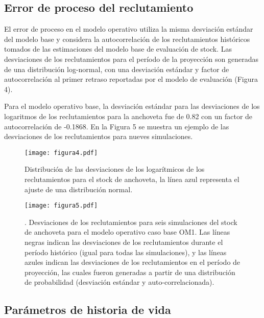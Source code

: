 
\subsection{Error de proceso del reclutamiento}

El error de proceso en el modelo operativo utiliza la misma desviación estándar del modelo base y considera la autocorrelación de los reclutamientos históricos tomados de las estimaciones del modelo base de evaluación de stock. Las desviaciones de los reclutamientos para el período de la proyección son generadas de una distribución log-normal, con una desviación estándar y factor de autocorrelación al primer retraso reportadas por el modelo de evaluación (Figura 4). 
\newline

Para el modelo operativo base, la desviación estándar para las desviaciones de los logaritmos de los reclutamientos para la anchoveta fue de 0.82 con un factor de autocorrelación de -0.1868. En la Figura 5 se muestra un ejemplo de las desviaciones de los reclutamientos para nueves simulaciones.

\begin{figure}[H]
    \centering
    \texttt{[image: figura4.pdf]}
    \caption{Distribución de las desviaciones de los logarítmicos de los reclutamientos para el stock de anchoveta, la línea azul representa el ajuste de una distribución normal.}
    \label{fig:figura4}
\end{figure}

\begin{figure}[H]
    \centering
    \texttt{[image: figura5.pdf]}
    \caption{. Desviaciones de los reclutamientos para seis simulaciones del stock de anchoveta para el modelo operativo caso base OM1. Las líneas negras indican las desviaciones de los reclutamientos durante el período histórico (igual para todas las simulaciones), y las líneas azules indican las desviaciones de los reclutamientos en el período de proyección, las cuales fueron generadas a partir de una distribución de probabilidad (desviación estándar y auto-correlacionada).}
    \label{fig:figura5}
\end{figure}

\subsection{Parámetros de historia de vida}

